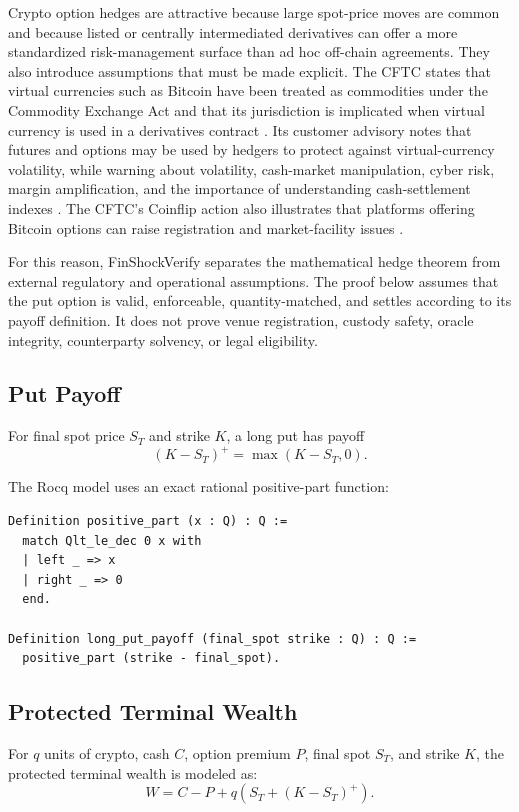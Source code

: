 \documentclass[11pt]{article}
\begin{document}
Crypto option hedges are attractive because large spot-price moves are common
and because listed or centrally intermediated derivatives can offer a more
standardized risk-management surface than ad hoc off-chain agreements. They
also introduce assumptions that must be made explicit. The CFTC states that
virtual currencies such as Bitcoin have been treated as commodities under the
Commodity Exchange Act and that its jurisdiction is implicated when virtual
currency is used in a derivatives contract \cite{cftcBitcoinBasics}. Its
customer advisory notes that futures and options may be used by hedgers to
protect against virtual-currency volatility, while warning about volatility,
cash-market manipulation, cyber risk, margin amplification, and the importance
of understanding cash-settlement indexes \cite{cftcVirtualCurrencyAdvisory}.
The CFTC's Coinflip action also illustrates that platforms offering Bitcoin
options can raise registration and market-facility issues
\cite{cftcCoinflip2015}.

For this reason, FinShockVerify separates the mathematical hedge theorem from
external regulatory and operational assumptions. The proof below assumes that
the put option is valid, enforceable, quantity-matched, and settles according
to its payoff definition. It does not prove venue registration, custody safety,
oracle integrity, counterparty solvency, or legal eligibility.

\subsection{Put Payoff}

For final spot price \(S_T\) and strike \(K\), a long put has payoff
\[
  (K - S_T)^+ = \max(K - S_T, 0).
\]

The Rocq model uses an exact rational positive-part function:

\begin{lstlisting}[language=Coq]
Definition positive_part (x : Q) : Q :=
  match Qlt_le_dec 0 x with
  | left _ => x
  | right _ => 0
  end.

Definition long_put_payoff (final_spot strike : Q) : Q :=
  positive_part (strike - final_spot).
\end{lstlisting}

\subsection{Protected Terminal Wealth}

For \(q\) units of crypto, cash \(C\), option premium \(P\), final spot
\(S_T\), and strike \(K\), the protected terminal wealth is modeled as:
\[
  W = C - P + q\left(S_T + (K - S_T)^+\right).
\]
\end{document}
